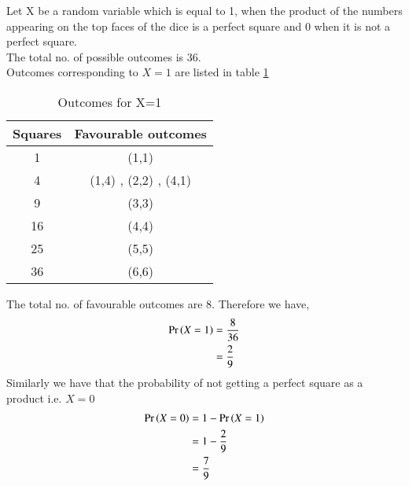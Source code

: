Let X be a random variable which is equal to 1, when the product of the numbers appearing on the top faces of the dice is a perfect square and 0 when it is not a perfect square. \\
The total no. of possible outcomes is 36.\\
Outcomes corresponding to $ X =1 $ are listed in table \ref{tab:Outcomes}
\begin{table}[hbt!]
\centering
\begin{tabular}{|c|c|}
\hline
\textbf{Squares} & \textbf{Favourable outcomes} \\ \hline
1                & (1,1)                        \\ \hline
4                & (1,4) , (2,2) , (4,1)        \\ \hline
9                & (3,3)                        \\ \hline
16               & (4,4)                        \\ \hline
25               & (5,5)                        \\ \hline
36               & (6,6)                        \\ \hline
\end{tabular}
\caption{Outcomes for X=1}
\label{tab:Outcomes}
\end{table}
The total no. of favourable outcomes are 8. Therefore we have,
\begin{align}
    \Pr\left(X=1\right)    &= \dfrac{8}{36}  \\
     &= \dfrac{2}{9}
\end{align}
Similarly we have that the probability of not getting a perfect square as a product i.e. $X=0$
\begin{align}
    \Pr\left(X=0\right) & = 1-  \Pr\left(X=1\right) \\
    &=  1-\dfrac{2}{9}  \\
     &= \dfrac{7}{9}
\end{align}